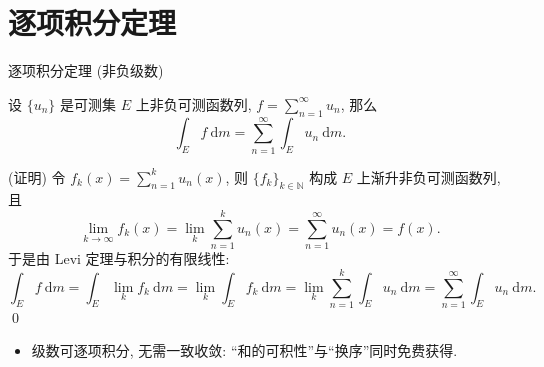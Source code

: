 
\section[逐项积分]{逐项积分定理}


\begin{frame}{逐项积分定理 (非负级数)}

\begin{thm}[逐项积分]
设 $\{u_n\}$ 是可测集 $E$ 上\alert{非负}可测函数列, $f = \sum_{n=1}^{\infty} u_n$, 那么
\[
\int_E f ~ \mathrm{d} m = \sum_{n=1}^{\infty} \int_E u_n ~ \mathrm{d} m .
\]
\end{thm}

\startproof[bg=yellow, fg=red](证明)
令 $f_k(x) = \sum_{n=1}^{k} u_n(x)$, 则 $\{f_k\}_{k \in \mathbb{N}}$ 构成 $E$ 上\alert{渐升}非负可测函数列, 且
\[
\lim_{k \to \infty} f_k(x) = \lim_{k} \sum_{n=1}^{k} u_n(x) = \sum_{n=1}^{\infty} u_n(x) = f(x) .
\]
于是由 Levi 定理与积分的有限线性:
\[
\int_E f ~ \mathrm{d} m
= \int_E \lim_k f_k ~ \mathrm{d} m
= \lim_k \int_E f_k ~ \mathrm{d} m
= \lim_k \sum_{n=1}^{k} \int_E u_n ~ \mathrm{d} m
= \sum_{n=1}^{\infty} \int_E u_n ~ \mathrm{d} m .
\]
\qed

\pause

\begin{itemize}
\item 级数可逐项积分, 无需一致收敛: ``和的可积性''与``换序''同时免费获得.
\end{itemize}

\end{frame}


